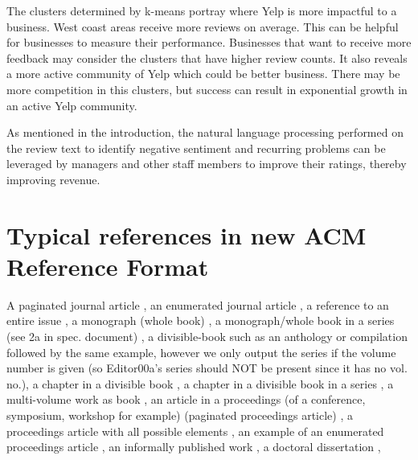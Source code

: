 \quad The clusters determined by k-means portray where Yelp is more impactful to a business. West coast areas receive more reviews on average. This can be helpful for businesses to measure their performance. Businesses that want to receive more feedback may consider the clusters that have higher review counts. It also reveals a more active community of Yelp which could be better business. There may be more competition in this clusters, but success can result in exponential growth in an active Yelp community.

\quad As mentioned in the introduction, the natural language processing performed on the review text to identify negative sentiment and recurring problems can be leveraged by managers and other staff members to improve their ratings, thereby improving revenue.



\section{Typical references in new ACM Reference Format}

A paginated journal article , an enumerated
journal article , a reference to an entire issue \cite{JCohen96}, a monograph (whole book) \cite{Kosiur01}, a monograph/whole book in a series (see 2a in spec. document)
\cite{Harel79}, a divisible-book such as an anthology or compilation \cite{Editor00}
followed by the same example, however we only output the series if the volume number is given
\cite{Editor00a} (so Editor00a's series should NOT be present since it has no vol. no.),
a chapter in a divisible book \cite{Spector90}, a chapter in a divisible book
in a series \cite{Douglass98}, a multi-volume work as book \cite{Knuth97},
an article in a proceedings (of a conference, symposium, workshop for example)
(paginated proceedings article) \cite{Andler79}, a proceedings article
with all possible elements \cite{Smith10}, an example of an enumerated
proceedings article \cite{VanGundy07},
an informally published work \cite{Harel78}, a doctoral dissertation \cite{Clarkson85},

{}

